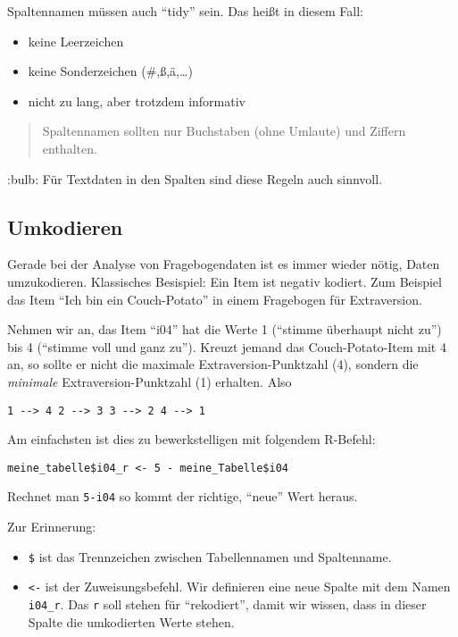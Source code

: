 \documentclass[]{article}
\providecommand{\tightlist}{%
  \setlength{\itemsep}{0pt}\setlength{\parskip}{0pt}}
\begin{document}
Spaltennamen müssen auch ``tidy'' sein. Das heißt in diesem Fall:

\begin{itemize}
\tightlist
\item
  keine Leerzeichen
\item
  keine Sonderzeichen (\#,ß,ä,\ldots{})
\item
  nicht zu lang, aber trotzdem informativ
\end{itemize}

\begin{quote}
Spaltennamen sollten nur Buchstaben (ohne Umlaute) und Ziffern
enthalten.
\end{quote}

:bulb: Für Textdaten in den Spalten sind diese Regeln auch sinnvoll.

\hypertarget{umkodieren}{%
\subsection{Umkodieren}\label{umkodieren}}

Gerade bei der Analyse von Fragebogendaten ist es immer wieder nötig,
Daten umzukodieren. Klassisches Besispiel: Ein Item ist negativ kodiert.
Zum Beispiel das Item ``Ich bin ein Couch-Potato'' in einem Fragebogen
für Extraversion.

Nehmen wir an, das Item ``i04'' hat die Werte 1 (``stimme überhaupt
nicht zu'') bis 4 (``stimme voll und ganz zu''). Kreuzt jemand das
Couch-Potato-Item mit 4 an, so sollte er nicht die maximale
Extraversion-Punktzahl (4), sondern die \emph{minimale}
Extraversion-Punktzahl (1) erhalten. Also

\texttt{1\ -\/-\textgreater{}\ 4\ 2\ -\/-\textgreater{}\ 3\ 3\ -\/-\textgreater{}\ 2\ 4\ -\/-\textgreater{}\ 1}

Am einfachsten ist dies zu bewerkstelligen mit folgendem R-Befehl:

\begin{verbatim}
meine_tabelle$i04_r <- 5 - meine_Tabelle$i04
\end{verbatim}

Rechnet man \texttt{5-i04} so kommt der richtige, ``neue'' Wert heraus.

Zur Erinnerung:

\begin{itemize}
\tightlist
\item
  \texttt{\$} ist das Trennzeichen zwischen Tabellennamen und
  Spaltenname.
\item
  \texttt{\textless{}-} ist der Zuweisungsbefehl. Wir definieren eine
  neue Spalte mit dem Namen \texttt{i04\_r}. Das \texttt{r} soll stehen
  für ``rekodiert'', damit wir wissen, dass in dieser Spalte die
  umkodierten Werte stehen.
\end{itemize}
\end{document}
